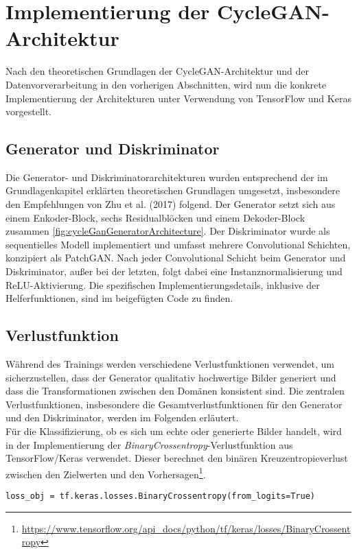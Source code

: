 \section{Implementierung der CycleGAN-Architektur}
Nach den theoretischen Grundlagen der CycleGAN-Architektur und der Datenvorverarbeitung in den vorherigen Abschnitten, wird nun die konkrete Implementierung der Architekturen unter Verwendung von TensorFlow und Keras vorgestellt.

\subsection{Generator und Diskriminator}
Die Generator- und Diskriminatorarchitekturen wurden entsprechend der im Grundlagenkapitel erklärten theoretischen Grundlagen umgesetzt, insbesondere den Empfehlungen von Zhu et al. (2017)\cite{Zhu.2017} folgend. Der Generator setzt sich aus einem Enkoder-Block, sechs Residualblöcken und einem Dekoder-Block zusammen \ref{fig:cycleGanGeneratorArchitecture}.
Der Diskriminator wurde als sequentielles Modell implementiert und umfasst mehrere Convolutional Schichten, konzipiert als PatchGAN. 
Nach jeder Convolutional Schicht beim Generator und Diskriminator, außer bei der letzten, folgt dabei eine Instanznormalisierung und ReLU-Aktivierung.
Die spezifischen Implementierungsdetails, inklusive der Helferfunktionen, sind im beigefügten Code zu finden.

\subsection{Verlustfunktion}
Während des Trainings werden verschiedene Verlustfunktionen verwendet, um sicherzustellen, dass der Generator qualitativ hochwertige Bilder generiert und dass die Transformationen zwischen den Domänen konsistent sind. Die zentralen Verlustfunktionen, insbesondere die Gesamtverlustfunktionen für den Generator und den Diskriminator, werden im Folgenden erläutert. 
\\
Für die Klassifizierung, ob es sich um echte oder generierte Bilder handelt, wird in der Implementierung der \textit{BinaryCrossentropy}-Verlustfunktion aus TensorFlow/Keras verwendet. 
Dieser berechnet den binären Kreuzentropieverlust zwischen den Zielwerten und den Vorhersagen\footnote{\url{https://www.tensorflow.org/api_docs/python/tf/keras/losses/BinaryCrossentropy}}.

\begin{lstlisting}[language=pyhaff, caption={Initialisierung des BinaryCrossentropy-Verlustfunktion}, label={cod:binaryCrossentropy}]
loss_obj = tf.keras.losses.BinaryCrossentropy(from_logits=True)
\end{lstlisting}


